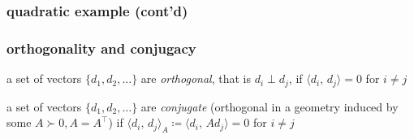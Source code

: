 \documentclass[10pt,dvipsnames*]{beamer}
\begin{document}
\begin{frame}
  \frametitle{quadratic example (cont'd)}
  \centering {}
\end{frame}
%
\begin{frame}
  \frametitle{orthogonality and conjugacy}
  \pause
  \begin{definition}[orthogonality]
    \label{def:orthogonal}
    a set of vectors $\{d_1, d_2, \ldots \}$ are \emph{orthogonal}, that is $d_i \perp d_j$, if $\langle d_i,\, d_j \rangle = 0$ for $i \ne j$
  \end{definition}
  \pause
  \begin{definition}[conjugacy]
    \label{def:conjugate}
    a set of vectors $\{d_1, d_2, \ldots \}$ are \emph{conjugate} (orthogonal in a geometry induced by some $A \succ 0, A=A^{\top}$) if $ \langle d_i,\, d_j \rangle_A \coloneqq \langle d_i,\, A d_j \rangle = 0$ for $i \ne j$
  \end{definition}
  \pause
  \centering {}\cite{shewchuk_cg_1994}
\end{frame}
\end{document}
